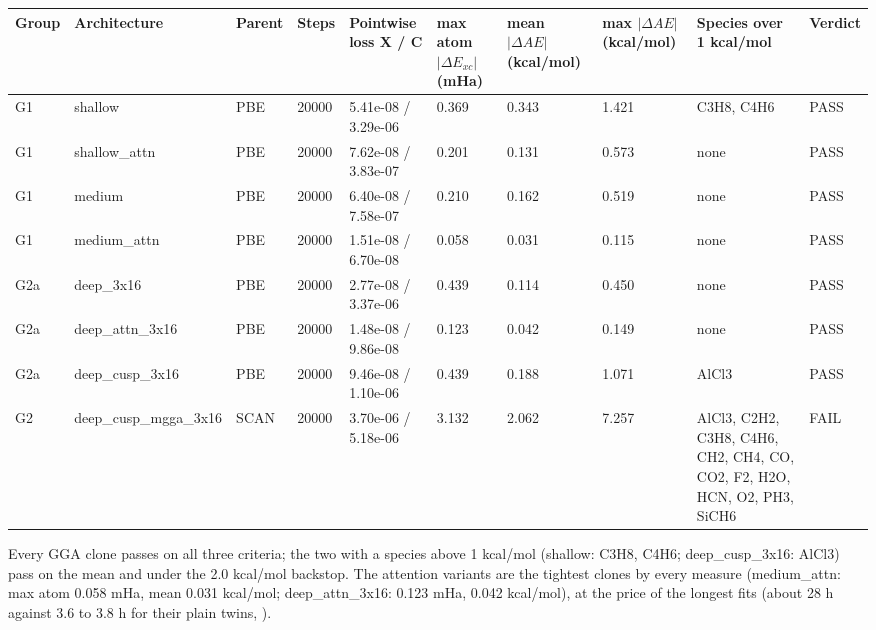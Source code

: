\documentclass[10pt,a4paper]{article}
\begin{document}
\begin{landscape}
\begin{tiny}
\begin{longtable}{llllllllll}
\toprule Group & Architecture & Parent & Steps & Pointwise loss X / C & max atom $\lvert\Delta E_{xc}\rvert$ (mHa) & mean $\lvert\Delta AE\rvert$ (kcal/mol) & max $\lvert\Delta AE\rvert$ (kcal/mol) & Species over 1 kcal/mol & Verdict \\ \midrule \endhead
G1 & shallow & PBE & 20000 & 5.41e-08 / 3.29e-06 & 0.369 & 0.343 & 1.421 & C3H8, C4H6 & PASS \\
G1 & shallow\_attn & PBE & 20000 & 7.62e-08 / 3.83e-07 & 0.201 & 0.131 & 0.573 & none & PASS \\
G1 & medium & PBE & 20000 & 6.40e-08 / 7.58e-07 & 0.210 & 0.162 & 0.519 & none & PASS \\
G1 & medium\_attn & PBE & 20000 & 1.51e-08 / 6.70e-08 & 0.058 & 0.031 & 0.115 & none & PASS \\
G2a & deep\_3x16 & PBE & 20000 & 2.77e-08 / 3.37e-06 & 0.439 & 0.114 & 0.450 & none & PASS \\
G2a & deep\_attn\_3x16 & PBE & 20000 & 1.48e-08 / 9.86e-08 & 0.123 & 0.042 & 0.149 & none & PASS \\
G2a & deep\_cusp\_3x16 & PBE & 20000 & 9.46e-08 / 1.10e-06 & 0.439 & 0.188 & 1.071 & AlCl3 & PASS \\
G2 & deep\_cusp\_mgga\_3x16 & SCAN & 20000 & 3.70e-06 / 5.18e-06 & 3.132 & 2.062 & 7.257 & AlCl3, C2H2, C3H8, C4H6, CH2, CH4, CO, CO2, F2, H2O, HCN, O2, PH3, SiCH6 & FAIL \\
\bottomrule \end{longtable}
\end{tiny}
\end{landscape}


Every GGA clone passes on all three criteria; the two with a species above 1 kcal/mol (shallow:
C3H8, C4H6; deep\_cusp\_3x16: AlCl3) pass on the mean and under the 2.0 kcal/mol backstop. The
attention variants are the tightest clones by every measure (medium\_attn: max atom 0.058 mHa,
mean 0.031 kcal/mol; deep\_attn\_3x16: 0.123 mHa, 0.042 kcal/mol), at the price of the longest
fits (about 28 h against 3.6 to 3.8 h for their plain twins, ).
\end{document}
